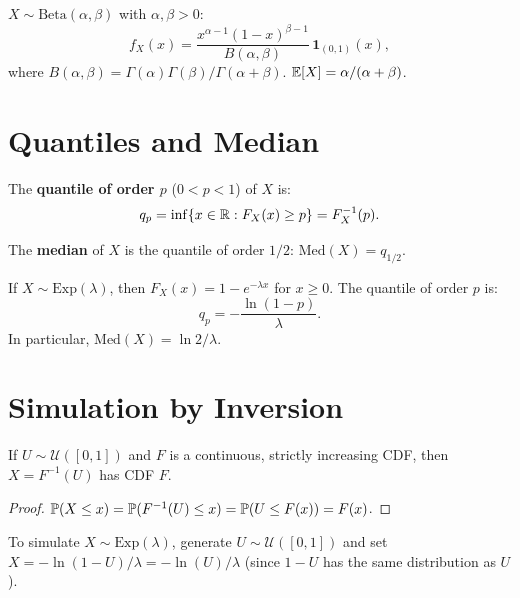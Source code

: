 \begin{definition}[Beta]
$X \sim \mathrm{Beta}(\alpha, \beta)$ with $\alpha, \beta > 0$:
\[
    f_X(x) = \frac{x^{\alpha-1}(1-x)^{\beta-1}}{B(\alpha,\beta)}\,
    \mathbf{1}_{(0,1)}(x),
\]
where $B(\alpha,\beta) = \Gamma(\alpha)\Gamma(\beta)/\Gamma(\alpha+\beta)$.
$\mathbb{E}[X] = \alpha/(\alpha+\beta)$.
\end{definition}

\section{Quantiles and Median}

\begin{definition}[Quantile]
The \textbf{quantile of order $p$} ($0 < p < 1$) of $X$ is:
\[
    q_p = \inf\{x \in \mathbb{R} : F_X(x) \geq p\} = F_X^{-1}(p).
\]
\end{definition}

\begin{definition}[Median]
The \textbf{median} of $X$ is the quantile of order $1/2$:
$\mathrm{Med}(X) = q_{1/2}$.
\end{definition}

\begin{example}
If $X \sim \mathrm{Exp}(\lambda)$, then $F_X(x) = 1 - e^{-\lambda x}$ for $x \geq 0$.
The quantile of order $p$ is:
\[
    q_p = -\frac{\ln(1-p)}{\lambda}.
\]
In particular, $\mathrm{Med}(X) = \ln 2/\lambda$.
\end{example}

\section{Simulation by Inversion}

\begin{theorem}
If $U \sim \mathcal{U}([0,1])$ and $F$ is a continuous, strictly increasing CDF,
then $X = F^{-1}(U)$ has CDF $F$.
\end{theorem}

\begin{proof}
$\mathbb{P}(X \leq x) = \mathbb{P}(F^{-1}(U) \leq x) = \mathbb{P}(U \leq F(x)) = F(x)$.
\end{proof}

\begin{example}
To simulate $X \sim \mathrm{Exp}(\lambda)$, generate $U \sim \mathcal{U}([0,1])$
and set $X = -\ln(1-U)/\lambda = -\ln(U)/\lambda$ (since $1-U$ has the same
distribution as $U$).
\end{example}

